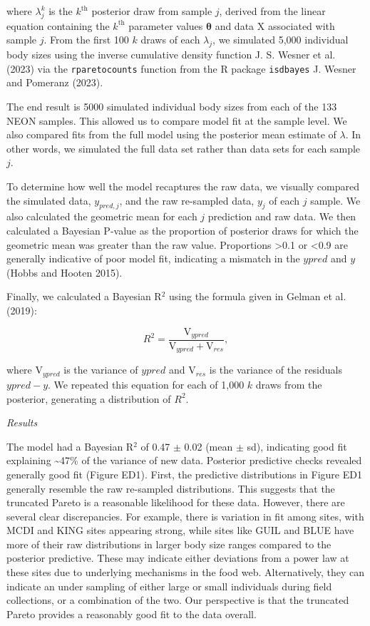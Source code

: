 \documentclass[
  12pt,
]{article}
\begin{document}
where \(\lambda_j^k\) is the \(k^{\text{th}}\) posterior draw from
sample \(j\), derived from the linear equation containing the
\(k^{\text{th}}\) parameter values \(\boldsymbol {\theta}\) and data
\(\text{X}\) associated with sample \(j\). From the first 100 \(k\)
draws of each \(\lambda_j\), we simulated 5,000 individual body sizes
using the inverse cumulative density function J. S. Wesner et al. (2023)
via the \texttt{rparetocounts} function from the R package
\texttt{isdbayes} J. Wesner and Pomeranz (2023).

The end result is 5000 simulated individual body sizes from each of the
133 NEON samples. This allowed us to compare model fit at the sample
level. We also compared fits from the full model using the posterior
mean estimate of \(\lambda\). In other words, we simulated the full data
set rather than data sets for each sample \(j\).

To determine how well the model recaptures the raw data, we visually
compared the simulated data, \(y_{pred,j}\), and the raw re-sampled
data, \(y_j\) of each \(j\) sample. We also calculated the geometric
mean for each \(j\) prediction and raw data. We then calculated a
Bayesian P-value as the proportion of posterior draws for which the
geometric mean was greater than the raw value. Proportions
\textgreater0.1 or \textless0.9 are generally indicative of poor model
fit, indicating a mismatch in the \(ypred\) and \(y\) (Hobbs and Hooten
2015).

Finally, we calculated a Bayesian R\(^2\) using the formula given in
Gelman et al. (2019):

\[  R^2 = \frac{\text{V}_{ypred}}{\text{V}_{ypred} + \text{V}_{res}}, \]

where \(\text{V}_{ypred}\) is the variance of \(ypred\) and
\(\text{V}_{res}\) is the variance of the residuals \(ypred - y\). We
repeated this equation for each of 1,000 \(k\) draws from the posterior,
generating a distribution of \(R^2\).

\emph{Results}

The model had a Bayesian R\(^2\) of 0.47 \(\pm\) 0.02 (mean \(\pm\) sd),
indicating good fit explaining \textasciitilde47\% of the variance of
new data. Posterior predictive checks revealed generally good fit
(Figure ED1). First, the predictive distributions in Figure ED1
generally resemble the raw re-sampled distributions. This suggests that
the truncated Pareto is a reasonable likelihood for these data. However,
there are several clear discrepancies. For example, there is variation
in fit among sites, with MCDI and KING sites appearing strong, while
sites like GUIL and BLUE have more of their raw distributions in larger
body size ranges compared to the posterior predictive. These may
indicate either deviations from a power law at these sites due to
underlying mechanisms in the food web. Alternatively, they can indicate
an under sampling of either large or small individuals during field
collections, or a combination of the two. Our perspective is that the
truncated Pareto provides a reasonably good fit to the data overall.
\end{document}
